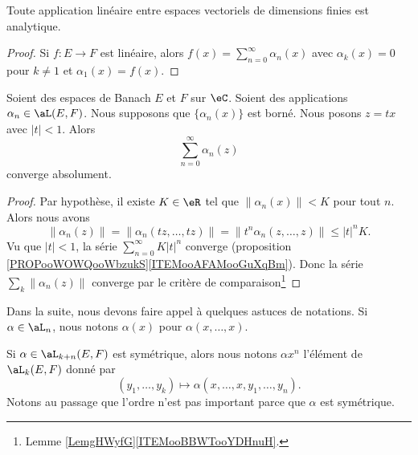 \begin{lemma}	\label{LEMooZRNAooUrDJOI}
	Toute application linéaire entre espaces vectoriels de dimensions finies est analytique.
\end{lemma}

\begin{proof}
	Si \(f \colon E\to F  \) est linéaire, alors \( f(x)=\sum_{n=0}^{\infty}\alpha_n(x)\) avec \( \alpha_k(x)=0\) pour \( k\neq 1\) et \( \alpha_1(x)=f(x)\).
\end{proof}

\begin{theorem}	\label{THOooNBNFooMsAorH}
	Soient des espaces de Banach \( E\) et \( F\) sur \( \eC\). Soient des applications \( \alpha_n\in\aL(E,F)\). Nous supposons que \( \{ \alpha_n(x) \}\) est borné. Nous posons \( z=tx\) avec \( | t |<1\). Alors
	\begin{equation}
		\sum_{n=0}^{\infty}\alpha_n(z)
	\end{equation}
	converge absolument.
\end{theorem}

\begin{proof}
	Par hypothèse, il existe \( K\in\eR\) tel que \( \| \alpha_n(x) \|<K\) pour tout \( n\). Alors nous avons
	\begin{equation}
		\| \alpha_n(z) \|=\| \alpha_n(tz,\ldots,tz) \|=\| t^n\alpha_n(z,\ldots,z) \|\leq | t |^nK.
	\end{equation}
	Vu que \( | t |<1\), la série \( \sum_{n=0}^{\infty}K| t |^n\) converge (proposition \ref{PROPooWOWQooWbzukS}\ref{ITEMooAFAMooGuXqBm}). Donc la série \( \sum_k\| \alpha_n(z) \|\) converge par le critère de comparaison\footnote{Lemme \ref{LemgHWyfG}\ref{ITEMooBBWTooYDHnuH}.}
\end{proof}

\begin{normaltext}		\label{NORMooQDCKooXHtrHQ}
	Dans la suite, nous devons faire appel à quelques astuces de notations. Si \( \alpha\in\aL_n\), nous notons \( \alpha(x)\) pour \( \alpha(x,\ldots,x)\).

	Si \( \alpha\in \aL_{k+n}(E,F)\) est symétrique, alors nous notons \( \alpha x^n\) l'élément de \(\aL_k(E,F) \) donné par
	\begin{equation}
		(y_1,\ldots,y_k)\mapsto \alpha(x,\ldots,x,y_1,\ldots,y_n).
	\end{equation}
	Notons au passage que l'ordre n'est pas important parce que \( \alpha\) est symétrique.
\end{normaltext}


